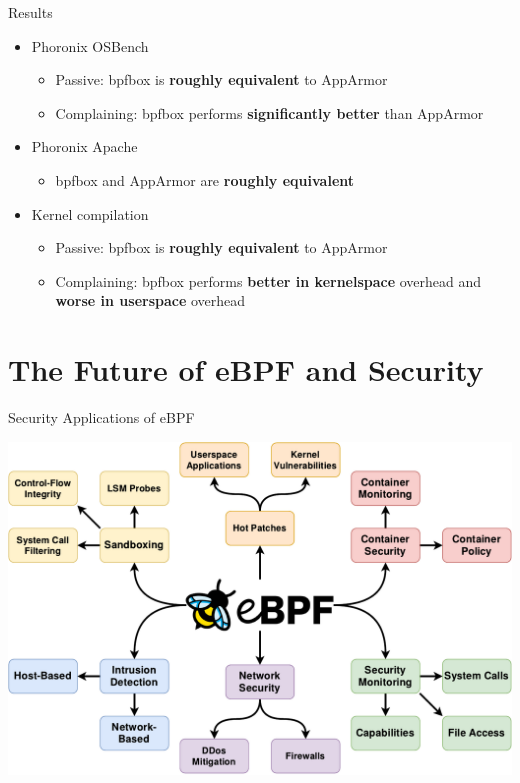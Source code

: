 \documentclass[12pt, dvipsnames, aspectratio=169]{beamer}
\begin{document}
\begin{frame}[c]{Results}
\begin{itemize}
    \item Phoronix OSBench
    \begin{itemize}
        \item Passive: bpfbox is \textbf{roughly equivalent} to AppArmor
        \item Complaining: bpfbox performs \textbf{significantly better} than AppArmor
    \end{itemize}

    \vfill
    \item Phoronix Apache
    \begin{itemize}
        \item bpfbox and AppArmor are \textbf{roughly equivalent}
    \end{itemize}

    \vfill
    \item Kernel compilation
    \begin{itemize}
        \item Passive: bpfbox is \textbf{roughly equivalent} to AppArmor
        \item Complaining: bpfbox performs \textbf{better in kernelspace} overhead and \textbf{worse in userspace} overhead
    \end{itemize}
\end{itemize}
\end{frame}

\section{The Future of eBPF and Security}

\begin{frame}[c]{Security Applications of eBPF}
\begin{center}
    \color{black}
    \includegraphics[height=0.8\textheight]{figs/ebpf-security.pdf}
\end{center}
\end{frame}
\end{document}
